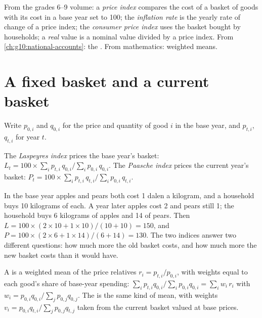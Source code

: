 \begin{recall}
From the grades 6--9 volume: a \emph{price index} compares the cost of a basket of goods with its cost in a base year set to 100; the \emph{inflation rate}
is the yearly rate of change of a price index; the \emph{consumer price index} uses the basket bought by households; a \emph{real} value is a nominal value
divided by a price index. From \cref{ch:g10:national-accounts}: the . From mathematics: weighted means.
\end{recall}

\section{A fixed basket and a current basket}\label{sec:g10:price-indices:baskets}

Write $p_{0,i}$ and $q_{0,i}$ for the price and quantity of good $i$ in the base year, and $p_{t,i}$, $q_{t,i}$ for year $t$.

\begin{definition}\label{def:g10:price-indices:laspeyres}
The \emph{Laspeyres index} prices the base year's basket: $L_t = 100 \times \sum_i p_{t,i}\,q_{0,i} \big/ \sum_i p_{0,i}\,q_{0,i}$. The
\emph{Paasche index} prices the current year's basket: $P_t = 100 \times \sum_i p_{t,i}\,q_{t,i} \big/ \sum_i p_{0,i}\,q_{t,i}$.
\end{definition}
\label{def:g10:price-indices:paasche}

\begin{example}\label{ex:g10:price-indices:two-goods}
In the base year apples and pears both cost 1 dalen a kilogram, and a household buys 10 kilograms of each. A year later apples cost 2 and pears still 1;
the household buys 6 kilograms of apples and 14 of pears. Then $L = 100 \times (2 \times 10 + 1 \times 10)/(10 + 10) = 150$, and $P = 100 \times (2 \times 6 + 1 \times
14)/(6 + 14) = 130$. The two indices answer two different questions: how much more the old basket costs, and how much more the new basket costs than it
would have.
\end{example}

A  is a weighted mean of the price relatives $r_i = p_{t,i}/p_{0,i}$, with weights equal to each good's share of base-year spending:
$\sum_i p_{t,i} q_{0,i} / \sum_i p_{0,i} q_{0,i} = \sum_i w_i\, r_i$ with $w_i = p_{0,i} q_{0,i} / \sum_j p_{0,j} q_{0,j}$. The  is the same kind of mean,
with weights $v_i = p_{0,i} q_{t,i} / \sum_j p_{0,j} q_{t,j}$ taken from the current basket valued at base prices.

